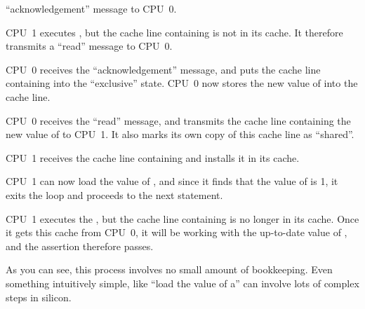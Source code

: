 \begin{sequence}
	``acknowledgement'' message to CPU~0.
\item	CPU~1 executes , but the cache line
	containing  is not in its cache.
	It therefore transmits a ``read'' message to CPU~0.
\item	CPU~0 receives the ``acknowledgement'' message, and puts
	the cache line containing  into the ``exclusive'' state.
	CPU~0 now stores the new value of  into the cache line.
\item	CPU~0 receives the ``read'' message, and transmits the
	cache line containing the new value of 
	to CPU~1.
	It also marks its own copy of this cache line as ``shared''.%
	\label{seq:app:whymb:Store buffers: All copies shared}
\item	CPU~1 receives the cache line containing  and installs
	it in its cache.
\item	CPU~1 can now load the value of ,
	and since it finds that the value of  is 1, it
	exits the  loop and proceeds
	to the next statement.
\item	CPU~1 executes the , but the cache line containing
	 is no longer in its cache.
	Once it gets this cache from CPU~0, it will be
	working with the up-to-date value of , and the assertion
	therefore passes.
\end{sequence}

\QuickQuizEnd

As you can see, this process involves no small amount of bookkeeping.
Even something intuitively simple, like ``load the value of a'' can
involve lots of complex steps in silicon.

